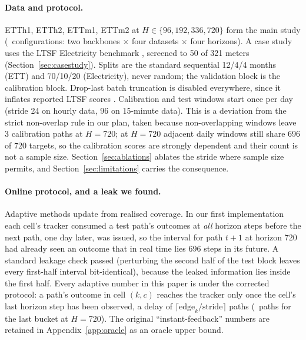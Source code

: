 \documentclass[11pt]{article}
\newcommand{\Hset}{\{96, 192, 336, 720\}}
\begin{document}
\paragraph{Data and protocol.} ETTh1, ETTh2, ETTm1, ETTm2 at $H \in \Hset$ form the main study (\ettNumConfigs\ configurations: two backbones $\times$ four datasets $\times$ four horizons). A case study uses the LTSF Electricity benchmark \citep{uci_electricity,lstnet}, screened to 50 of 321 meters (Section~\ref{sec:casestudy}). Splits are the standard sequential 12/4/4 months (ETT) and 70/10/20 (Electricity), never random; the validation block is the calibration block. Drop-last batch truncation is disabled everywhere, since it inflates reported LTSF scores \citep{tfb}. Calibration and test windows start once per day (stride 24 on hourly data, 96 on 15-minute data). This is a deviation from the strict non-overlap rule in our plan, taken because non-overlapping windows leave 3 calibration paths at $H = 720$; at $H = 720$ adjacent daily windows still share 696 of 720 targets, so the calibration scores are strongly dependent and their count is not a sample size. Section~\ref{sec:ablations} ablates the stride where sample size permits, and Section~\ref{sec:limitations} carries the consequence.

\paragraph{Online protocol, and a leak we found.} Adaptive methods update from realised coverage. In our first implementation each cell's tracker consumed a test path's outcomes at \emph{all} horizon steps before the next path, one day later, was issued, so the interval for path $t{+}1$ at horizon 720 had already seen an outcome that in real time lies 696 steps in its future. A standard leakage check passed (perturbing the second half of the test block leaves every first-half interval bit-identical), because the leaked information lies inside the first half. Every adaptive number in this paper is under the corrected protocol: a path's outcome in cell $(k,c)$ reaches the tracker only once the cell's last horizon step has been observed, a delay of $\lceil \text{edge}_k / \text{stride} \rceil$ paths (\ettLagLastBucketSevenTwenty\ paths for the last bucket at $H = 720$). The original ``instant-feedback'' numbers are retained in Appendix~\ref{app:oracle} as an oracle upper bound.
\end{document}
